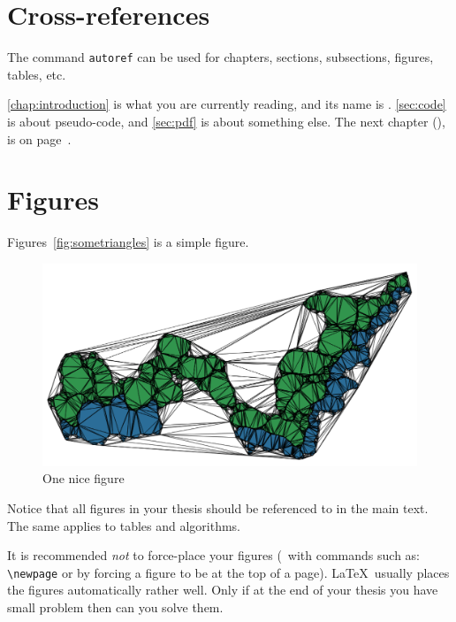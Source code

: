 %
\section{Cross-references}

The command \texttt{autoref} can be used for chapters, sections, subsections, figures, tables, etc.

\autoref{chap:introduction} is what you are currently reading, and its name is .
\autoref{sec:code} is about pseudo-code, and \autoref{sec:pdf} is about something else.
The next chapter (), is on page~\pageref{chap:rw}.


%
\section{Figures}
\label{sec:figures}

Figures~\autoref{fig:sometriangles} is a simple figure.
\begin{figure}
  \centering
  \includegraphics[width=0.8\linewidth]{figs/sometriangles.png}
  \caption{One nice figure}
\label{fig:sometriangles}
\end{figure}
Notice that all figures in your thesis should be referenced to in the main text.
The same applies to tables and algorithms.

It is recommended \emph{not} to force-place your figures (\eg\ with commands such as: \texttt{\textbackslash newpage} or by forcing a figure to be at the top of a page).
\LaTeX\ usually places the figures automatically rather well.
Only if at the end of your thesis you have small problem then can you solve them.

